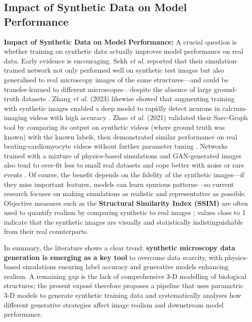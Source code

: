 \documentclass[
oneside,      %
openany       %
]{imc-inf}
\begin{document}
	\subsection{Impact of Synthetic Data on Model Performance}
	\textbf{Impact of Synthetic Data on Model Performance:} A crucial question is whether training on synthetic data actually improves model performance on real data. Early evidence is encouraging. Sekh \textit{et al.} reported that their simulation-trained network not only performed well on synthetic test images but also generalised to real microscopy images of the same structures—and could be transfer-learned to different microscopes—despite the absence of large ground-truth datasets \cite{sekh2021}. Zhang \textit{et al.} (2023) likewise showed that augmenting training with synthetic images enabled a deep model to rapidly detect neurons in calcium-imaging videos with high accuracy \cite{zhang2023synthetic}. Zhao \textit{et al.} (2021) validated their Sarc-Graph tool by comparing its output on synthetic videos (where ground truth was known) with the known labels, then demonstrated similar performance on real beating-cardiomyocyte videos without further parameter tuning \cite{zhao2021}. Networks trained with a mixture of physics-based simulations and GAN-generated images also tend to over-fit less to small real datasets and cope better with noise or rare events \cite{majurski2019gan}. Of course, the benefit depends on the fidelity of the synthetic images—if they miss important features, models can learn spurious patterns—so current research focuses on making simulations as realistic and representative as possible. Objective measures such as the \textbf{Structural Similarity Index (SSIM)} are often used to quantify realism by comparing synthetic to real images \cite{wang2004image}; values close to 1 indicate that the synthetic images are visually and statistically indistinguishable from their real counterparts.
	
	In summary, the literature shows a clear trend: \textbf{synthetic microscopy data generation is emerging as a key tool} to overcome data scarcity, with physics-based simulations ensuring label accuracy and generative models enhancing realism. A remaining gap is the lack of comprehensive 3-D modelling of biological structures; the present exposé therefore proposes a pipeline that uses parametric 3-D models to generate synthetic training data and systematically analyses how different generative strategies affect image realism and downstream model performance.
	
\end{document}
